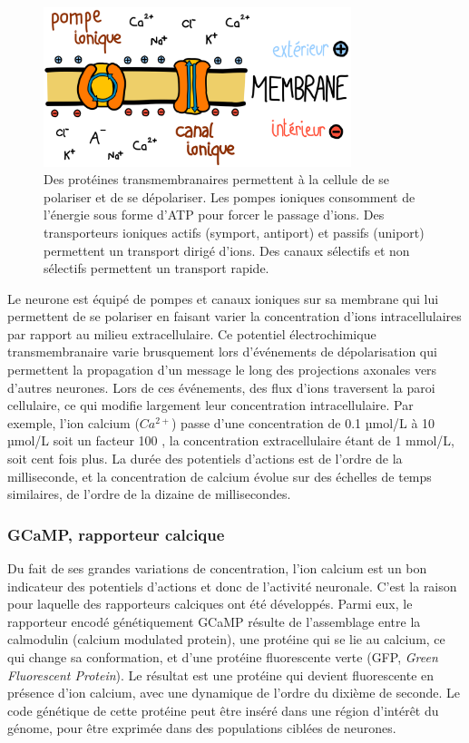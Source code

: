 \begin{figure}
  \centering
  \includegraphics[width=0.8\textwidth]{./files/membrane.svg.png}
  \caption{Des protéines transmembranaires permettent à la cellule de se polariser et de se dépolariser. Les pompes ioniques consomment de l'énergie sous forme d'ATP pour forcer le passage d'ions. Des transporteurs ioniques actifs (symport, antiport) et passifs (uniport) permettent un transport dirigé d'ions. Des canaux sélectifs et non sélectifs permettent un transport rapide.}
  \end{figure}

Le neurone est équipé de pompes et canaux ioniques sur sa membrane qui lui permettent de se polariser en faisant varier la concentration d'ions intracellulaires par rapport au milieu extracellulaire. Ce potentiel électrochimique transmembranaire varie brusquement lors d'événements de dépolarisation qui permettent la propagation d'un message le long des projections axonales vers d'autres neurones. Lors de ces événements, des flux d'ions traversent la paroi cellulaire, ce qui modifie largement leur concentration intracellulaire. Par exemple, l'ion calcium ($Ca^{2+}$) passe d'une concentration de 0.1 µmol/L à 10 µmol/L soit un facteur 100 \cite{grienberger_imaging_2012}, la concentration extracellulaire étant de 1 mmol/L, soit cent fois plus. La durée des potentiels d'actions est de l'ordre de la milliseconde, et la concentration de calcium évolue sur des échelles de temps similaires, de l'ordre de la dizaine de millisecondes. %

\subsubsection{GCaMP, rapporteur calcique}

Du fait de ses grandes variations de concentration, l'ion calcium est un bon indicateur des potentiels d'actions et donc de l'activité neuronale. C'est la raison pour laquelle des rapporteurs calciques ont été développés. Parmi eux, le rapporteur encodé génétiquement GCaMP résulte de l'assemblage entre la calmodulin (calcium modulated protein), une protéine qui se lie au calcium, ce qui change sa conformation, et d'une protéine fluorescente verte (GFP, \emph{Green Fluorescent Protein}). Le résultat est une protéine qui devient fluorescente en présence d'ion calcium, avec une dynamique de l'ordre du dixième de seconde. Le code génétique de cette protéine peut être inséré dans une région d'intérêt du génome, pour être exprimée dans des populations ciblées de neurones.

